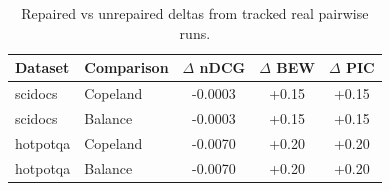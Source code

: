 \begin{table}[t]
\centering
\caption{Repaired vs unrepaired deltas from tracked real pairwise runs.}
\label{tab:repair_deltas}
\begin{tabular}{llccc}
\toprule
Dataset & Comparison & $\Delta$ nDCG & $\Delta$ BEW & $\Delta$ PIC \\
\midrule
scidocs & Copeland & -0.0003 & +0.15 & +0.15 \\
scidocs & Balance & -0.0003 & +0.15 & +0.15 \\
hotpotqa & Copeland & -0.0070 & +0.20 & +0.20 \\
hotpotqa & Balance & -0.0070 & +0.20 & +0.20 \\
\bottomrule
\end{tabular}
\end{table}
